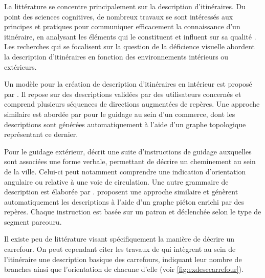 \newpar{}


La littérature se concentre principalement sur la description d'itinéraires. Du point des sciences cognitives, de nombreux travaux se sont intéressés aux principes et pratiques pour communiquer efficacement la connaissance d’un itinéraire, en analysant les éléments qui le constituent et influent sur sa qualité \cite{Allen2000,Lovelace1999}. Les recherches qui se focalisent sur la question de la déficience visuelle abordent la description d'itinéraires en fonction des environnements intérieurs ou extérieurs.

Un modèle pour la création de description d'itinéraires en intérieur est proposé par \cite{Troeger2020}. Il repose sur des descriptions validées par des utilisateurs concernés et comprend plusieurs séquences de directions augmentées de repères. Une approche similaire est abordée par \cite{Kulyukin2008} pour le guidage au sein d'un commerce, dont les descriptions sont générées automatiquement à l'aide d'un graphe topologique représentant ce dernier.

Pour le guidage extérieur, \cite{gaunet_verbal_2006} décrit une suite d’instructions de guidage auxquelles sont associées une forme verbale, permettant de décrire un cheminement au sein de la ville. Celui-ci peut notamment comprendre une indication d’orientation angulaire ou relative à une voie de circulation. Une autre grammaire de description est élaborée par \cite{Constantinescu2019}. \cite{Balata2016} proposent une approche similaire et génèrent automatiquement les descriptions à l'aide d'un graphe piéton enrichi par des repères. Chaque instruction est basée sur un patron et déclenchée selon le type de segment parcouru.



\newpar{}

Il existe peu de littérature visant spécifiquement la manière de décrire un carrefour. On peut cependant citer les travaux de \cite{gaunet_verbal_2006} qui intègrent au sein de l'itinéraire une description basique des carrefours, indiquant leur nombre de branches ainsi que l'orientation de chacune d'elle (voir \ref{fig:exdesccarrefour}).

